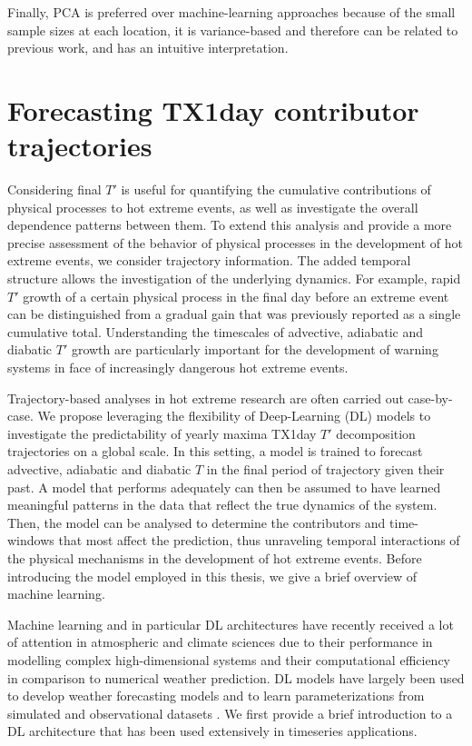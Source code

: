 \documentclass[11pt,a4paper,twoside,openright]{report}
\theoremstyle{definition}
\begin{document}
Finally, PCA is preferred over machine-learning approaches because of the small sample sizes at each location, it is variance-based and therefore can be related to previous work, and has an intuitive interpretation.

\section{Forecasting TX1day contributor trajectories}\label{forecasting-tx1day-contributor-trajectories}

Considering final \(T'\) is useful for quantifying the cumulative contributions of physical processes to hot extreme events, as well as investigate the overall dependence patterns between them. To extend this analysis and provide a more precise assessment of the behavior of physical processes in the development of hot extreme events, we consider trajectory information. The added temporal structure allows the investigation of the underlying dynamics. For example, rapid \(T'\) growth of a certain physical process in the final day before an extreme event can be distinguished from a gradual gain that was previously reported as a single cumulative total. Understanding the timescales of advective, adiabatic and diabatic \(T'\) growth are particularly important for the development of warning systems in face of increasingly dangerous hot extreme events.

Trajectory-based analyses in hot extreme research are often carried out case-by-case. We propose leveraging the flexibility of Deep-Learning (DL) models to investigate the predictability of yearly maxima TX1day \(T'\) decomposition trajectories on a global scale. In this setting, a model is trained to forecast advective, adiabatic and diabatic \(T\) in the final period of trajectory given their past. A model that performs adequately can then be assumed to have learned meaningful patterns in the data that reflect the true dynamics of the system. Then, the model can be analysed to determine the contributors and time-windows that most affect the prediction, thus unraveling temporal interactions of the physical mechanisms in the development of hot extreme events. Before introducing the model employed in this thesis, we give a brief overview of machine learning.

Machine learning and in particular DL architectures have recently received a lot of attention in atmospheric and climate sciences due to their performance in modelling complex high-dimensional systems and their computational efficiency in comparison to numerical weather prediction. DL models have largely been used to develop weather forecasting models \citep[see for example][]{srivastava_weather_2022} and to learn parameterizations from simulated and observational datasets \citep{barahona_deep_2023}. We first provide a brief introduction to a DL architecture that has been used extensively in timeseries applications.
\end{document}
